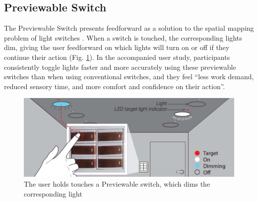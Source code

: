 \documentclass[a4paper]{article}
\begin{document}
	\subsection{Previewable Switch} \label{subsection_previewable_switch}
	The Previewable Switch presents feedforward as a solution to the spatial mapping problem of light switches \cite{park2014previewable}. When a switch is touched, the corresponding lights dim, giving the user feedforward on which lights will turn on or off if they continue their action (Fig. \ref{fig:park2014previewable_demo}). In the accompanied user study, participants consistently toggle lights faster and more accurately using these previewable switches than when using conventional switches, and they feel ``less work demand, reduced sensory time, and more comfort and confidence on their action''.

	\begin{figure}
		\centering
		\includegraphics[width=0.7\linewidth]{img/park2014previewable/demo.png}
		\caption{The user holds touches a Previewable switch, which dims the corresponding light \cite{park2014previewable}}
		\label{fig:park2014previewable_demo}
	\end{figure}
\end{document}
